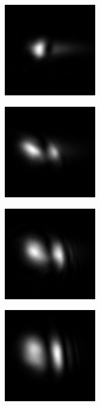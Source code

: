 \begin{figure}[ht]
  \centering
  \begin{subfigure}[b]{4cm}
    \includegraphics[width=4cm,keepaspectratio]{interference/figures/move/123-11.jpg}\caption{}
  \end{subfigure}
  \begin{subfigure}[b]{4cm}
    \includegraphics[width=4cm,keepaspectratio]{interference/figures/move/123-10.jpg}\caption{}
  \end{subfigure}
  \begin{subfigure}[b]{4cm}
    \includegraphics[width=4cm,keepaspectratio]{interference/figures/move/123-9.jpg}\caption{}
  \end{subfigure}
  \begin{subfigure}[b]{4cm}
    \includegraphics[width=4cm,keepaspectratio]{interference/figures/move/123-8.jpg}\caption{}
  \end{subfigure}

\end{figure}
